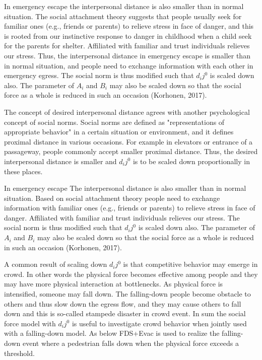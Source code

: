 \documentclass{article}
\begin{document}

In emergency escape the interpersonal distance is also smaller than in normal situation.  
The social attachment theory suggests that people usually seek for familiar ones (e.g., friends or parents) to relieve stress in face of danger, and this is rooted from our instinctive response to danger in childhood when a child seek for the parents for shelter.  Affiliated with familiar and trust individuals relieves our stress.  Thus, the interpersonal distance in emergency escape is smaller than in normal situation, and people need to exchange information with each other in emergency egress.  The social norm is thus modified such that $d_ij^0$ is scaled down also.  The parameter of $A_i$ and $B_i$ may also be scaled down so that the social force as a whole is reduced in such an occasion (Korhonen, 2017).   

The concept of desired interpersonal distance agrees with another psychological concept of social norms.  Social norms are defined as "representations of appropriate behavior" in a certain situation or environment, and it defines proximal distance in various occasions.  For example in elevators or entrance of a passageway, people commonly accept smaller proximal distance.   Thus, the desired interpersonal distance is smaller and $d_ij^0$ is to be scaled down proportionally in these places.  

In emergency escape The interpersonal distance is also smaller than in normal situation.  Based on social attachment theory people need to exchange information with familiar ones (e.g., friends or parents) to relieve stress in face of danger.  Affiliated with familiar and trust individuals relieves our stress.  The social norm is thus modified such that $d_ij^0$ is scaled down also.  The parameter of $A_i$ and $B_i$ may also be scaled down so that the social force as a whole is reduced in such an occasion (Korhonen, 2017).   
   
A common result of scaling down $d_ij^0$ is that competitive behavior may emerge in crowd.  In other words the physical force becomes effective among people and they may have more physical interaction at bottlenecks.  As physical force is intensified, someone may fall down.  The falling-down people become obstacle to others and thus slow down the egress flow, and they may cause others to fall down and this is so-called stampede disaster in crowd event.  In sum the social force model with $d_ij^0$ is useful to investigate crowd behavior when jointly used with a falling-down model.  As below FDS+Evac is used to realize the falling-down event where a pedestrian falls down when the physical force exceeds a threshold.      
\end{document}
